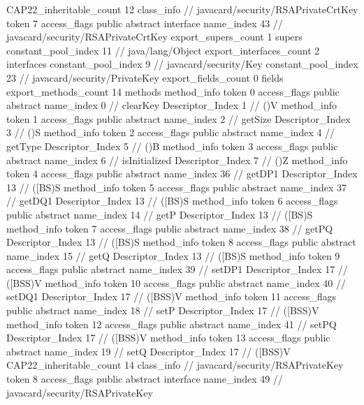{{{{{				}
			}
			CAP22_inheritable_count	12
		}
		class_info {		// javacard/security/RSAPrivateCrtKey
			token	7
			access_flags	public abstract interface
			name_index	43		// javacard/security/RSAPrivateCrtKey
			export_supers_count	1
			supers {
				constant_pool_index	11		// java/lang/Object
			}
			export_interfaces_count	2
			interfaces {
				constant_pool_index	9		// javacard/security/Key
				constant_pool_index	23		// javacard/security/PrivateKey
			}
			export_fields_count	0
			fields {
			}
			export_methods_count	14
			methods {
				method_info {
					token	0
					access_flags	public abstract
					name_index	0		// clearKey
					Descriptor_Index	1		// ()V
				}
				method_info {
					token	1
					access_flags	public abstract
					name_index	2		// getSize
					Descriptor_Index	3		// ()S
				}
				method_info {
					token	2
					access_flags	public abstract
					name_index	4		// getType
					Descriptor_Index	5		// ()B
				}
				method_info {
					token	3
					access_flags	public abstract
					name_index	6		// isInitialized
					Descriptor_Index	7		// ()Z
				}
				method_info {
					token	4
					access_flags	public abstract
					name_index	36		// getDP1
					Descriptor_Index	13		// ([BS)S
				}
				method_info {
					token	5
					access_flags	public abstract
					name_index	37		// getDQ1
					Descriptor_Index	13		// ([BS)S
				}
				method_info {
					token	6
					access_flags	public abstract
					name_index	14		// getP
					Descriptor_Index	13		// ([BS)S
				}
				method_info {
					token	7
					access_flags	public abstract
					name_index	38		// getPQ
					Descriptor_Index	13		// ([BS)S
				}
				method_info {
					token	8
					access_flags	public abstract
					name_index	15		// getQ
					Descriptor_Index	13		// ([BS)S
				}
				method_info {
					token	9
					access_flags	public abstract
					name_index	39		// setDP1
					Descriptor_Index	17		// ([BSS)V
				}
				method_info {
					token	10
					access_flags	public abstract
					name_index	40		// setDQ1
					Descriptor_Index	17		// ([BSS)V
				}
				method_info {
					token	11
					access_flags	public abstract
					name_index	18		// setP
					Descriptor_Index	17		// ([BSS)V
				}
				method_info {
					token	12
					access_flags	public abstract
					name_index	41		// setPQ
					Descriptor_Index	17		// ([BSS)V
				}
				method_info {
					token	13
					access_flags	public abstract
					name_index	19		// setQ
					Descriptor_Index	17		// ([BSS)V
				}
			}
			CAP22_inheritable_count	14
		}
		class_info {		// javacard/security/RSAPrivateKey
			token	8
			access_flags	public abstract interface
			name_index	49		// javacard/security/RSAPrivateKey
}}}
